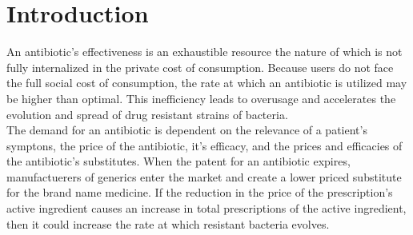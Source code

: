 \documentclass[11pt]{SelfArxOneColBMN}
\date{\small{Version 01142020 : Compiled ~\today}}
\begin{document}
%
	
\section{Introduction}
\label{sec:introduction}

\noindent




An antibiotic's effectiveness is an exhaustible resource the nature of which is not fully internalized in the private cost of consumption. Because users do not face the full social cost of consumption, the rate at which an antibiotic is utilized may be higher than optimal. This inefficiency leads to overusage and accelerates the evolution and spread of drug resistant strains of bacteria.\\

The demand for an antibiotic is dependent on the relevance of a patient's symptons, the price of the antibiotic, it's efficacy, and the prices and efficacies of the antibiotic's substitutes. When the patent for an antibiotic expires, manufactuerers of generics enter the market and create a lower priced substitute for the brand name medicine. If the reduction in the price of the prescription's active ingredient causes an increase in total prescriptions of the active ingredient, then it could increase the rate at which resistant bacteria evolves.\\
\end{document}

